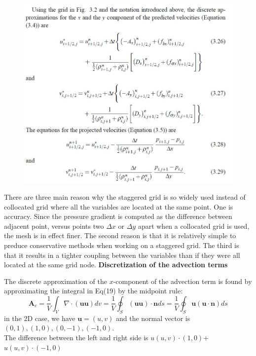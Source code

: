 \documentclass[11pt]{article} %
\begin{document}
\begin{figure}[h]
\includegraphics[scale=0.6]{Predicted velocity.JPG}
\centering
\end{figure}\par
There are three main reason why the staggered grid is so widely used  instead of collocated grid where all the variables are located at the same point. One is accuracy. Since the pressure gradient is computed as the difference between adjacent point, versus points two $\Delta x$ or $\Delta y$ apart when a collocated grid is used, the mesh is in effect finer. The second reason is that it is relatively simple to preduce conservative methods when working on a staggered grid. The third is that it results in a tighter coupling between the variables than if they were all located at the same grid node. 
\vspace{3mm}
\textbf{Discretization of the advection terms}\par
The discrete approximation of the $x$-component of the advection term is found by approximating the integral in Eq(19) by the midpoint rule:
$$
\textbf{A}_{c} = \frac{1}{V}  \int_{V} \nabla \cdot (\textbf{uu})dv=\frac{1}{V}  \oint_{S}  (\textbf{uu}) \cdot \textbf{n}ds = \frac{1}{V}  \oint_{S}  \textbf{u}(\textbf{u} \cdot \textbf{n})ds
$$in the 2D case, we have $\textbf{u} = (u, v)$ and the normal vector is $(0, 1), (1, 0), (0, -1), (-1, 0)$.\\
The difference between the left and right side is $u (u,v)\cdot(1,0)$+$u (u,v)\cdot(-1,0)$\\
\end{document}
